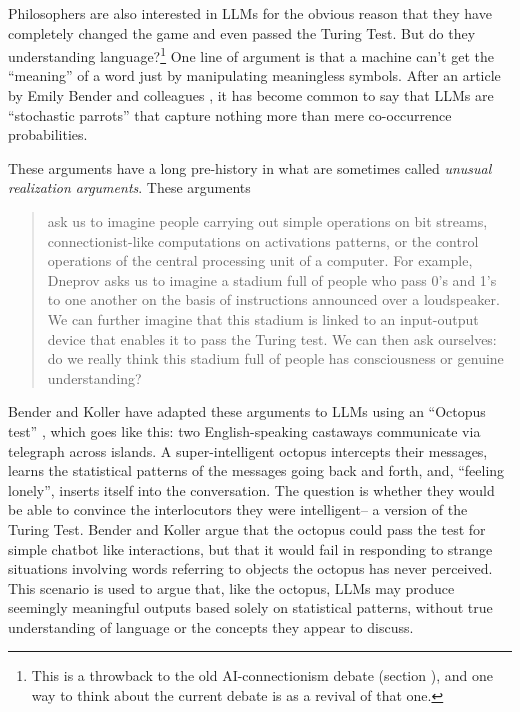 Philosophers are also interested in LLMs for the obvious reason that they have completely changed the game and even passed the Turing Test. But do they understanding language?\footnote{This is a throwback to the old AI-connectionism debate (section ), and one way to think about the current debate is as a revival of that one.} One line of argument is that a machine can’t get the ``meaning'' of a word just by manipulating meaningless symbols. After an article by Emily Bender and colleagues \cite{bender2021dangers}, it has become common to say that LLMs are ``stochastic parrots'' that capture nothing more than mere co-occurrence probabilities. 

These arguments have a long pre-history in what are sometimes called \emph{unusual realization arguments}. These arguments
\begin{quote}
ask us to imagine people carrying out simple operations on bit streams, connectionist-like computations on activations patterns, or the control operations of the central processing unit of a computer. For example, Dneprov asks us to imagine a stadium full of people who pass 0’s and 1’s to one another on the basis of instructions announced over a loudspeaker. We can further imagine that this stadium is linked to an input-output device that enables it to pass the Turing test. We can then ask ourselves: do we really think this stadium full of people has consciousness or genuine understanding? \cite{noelle2022artificial}
\end{quote}

Bender and Koller have adapted these arguments to LLMs using an ``Octopus test'' \cite{bender2020climbing}, which goes like this: two English-speaking castaways communicate via telegraph across islands. A super-intelligent octopus intercepts their messages, learns the statistical patterns of the messages going back and forth, and, ``feeling lonely'', inserts itself into the conversation. The question is whether they would be able to convince the interlocutors they were intelligent-- a version of the Turing Test. Bender and Koller argue that the octopus could pass the test for simple chatbot like interactions, but that it would fail in responding to strange situations involving words referring to objects the octopus has never perceived. This scenario is used to argue that, like the octopus, LLMs may produce seemingly meaningful outputs based solely on statistical patterns, without true understanding of language or the concepts they appear to discuss.

